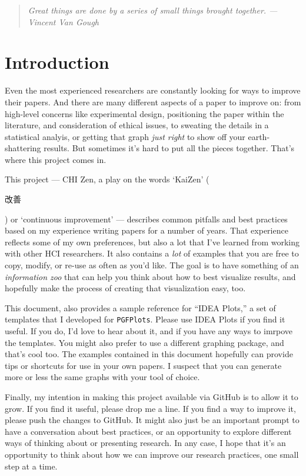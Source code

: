 
\vspace{2em}
\begin{quote}
    \emph{Great things are done by a series of small things brought together. --- Vincent Van Gough}
\end{quote}


\section{Introduction}

Even the most experienced researchers are constantly looking for ways to improve their papers. And there are many different aspects of a paper to improve on: from high-level concerns like experimental design, positioning the paper within the literature, and consideration of ethical issues, to sweating the details in a statistical analyis, or getting that graph \emph{just right} to show off your earth-shattering results. But sometimes it's hard to put all the pieces together. That's where this project comes in. 

This project --- CHI Zen, a play on the words `KaiZen' (\begin{CJK}{UTF8}{min}改善\end{CJK}) or `continuous improvement' --- describes common pitfalls and best practices based on my experience writing papers for a number of years. That experience reflects some of my own preferences, but also a lot that I've learned from working with other HCI researchers. It also contains a \emph{lot} of examples that you are free to copy, modify, or re-use as often as you'd like. The goal is to have something of an \emph{information zoo} \cite{heer2010tour} that can help you think about how to best visualize results, and hopefully make the process of creating that visualization easy, too. 

This document, also provides a sample reference for ``IDEA Plots,'' a set of templates that I developed for \texttt{PGFPlots}. Please use IDEA Plots if you find it useful. If you do, I'd love to hear about it, and if you have any ways to imrpove the templates. You might also prefer to use a different graphing package, and that's cool too. The examples contained in this document hopefully can provide tips or shortcuts for use in your own papers. I suspect that you can generate more or less the same graphs with your tool of choice. 

Finally, my intention in making this project available via GitHub is to allow it to grow. If you find it useful, please drop me a line. If you find a way to improve it, please push the changes to GitHub. It might also just be an important prompt to have a conversation about best practices, or an opportunity to explore different ways of thinking about or presenting research. In any case, I hope that it's an opportunity to think about how we can improve our research practices, one small step at a time. 

